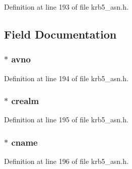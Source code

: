 Definition at line 193 of file krb5\+\_\+asn.\+h.



\subsection{Field Documentation}
\subsubsection[{\texorpdfstring{avno}{avno}}]{ $\ast$ avno}\hypertarget{structkrb5__authenticator__st_ab617b5fa201d42eb0463f838d776ad15}{}\label{structkrb5__authenticator__st_ab617b5fa201d42eb0463f838d776ad15}


Definition at line 194 of file krb5\+\_\+asn.\+h.

\subsubsection[{\texorpdfstring{crealm}{crealm}}]{ $\ast$ crealm}\hypertarget{structkrb5__authenticator__st_a05e3cdbc38c44e21ecf75a0f735f18e5}{}\label{structkrb5__authenticator__st_a05e3cdbc38c44e21ecf75a0f735f18e5}


Definition at line 195 of file krb5\+\_\+asn.\+h.

\subsubsection[{\texorpdfstring{cname}{cname}}]{ $\ast$ cname}\hypertarget{structkrb5__authenticator__st_a8dc3c9f72edab0c323ebc085c5db6423}{}\label{structkrb5__authenticator__st_a8dc3c9f72edab0c323ebc085c5db6423}


Definition at line 196 of file krb5\+\_\+asn.\+h.


